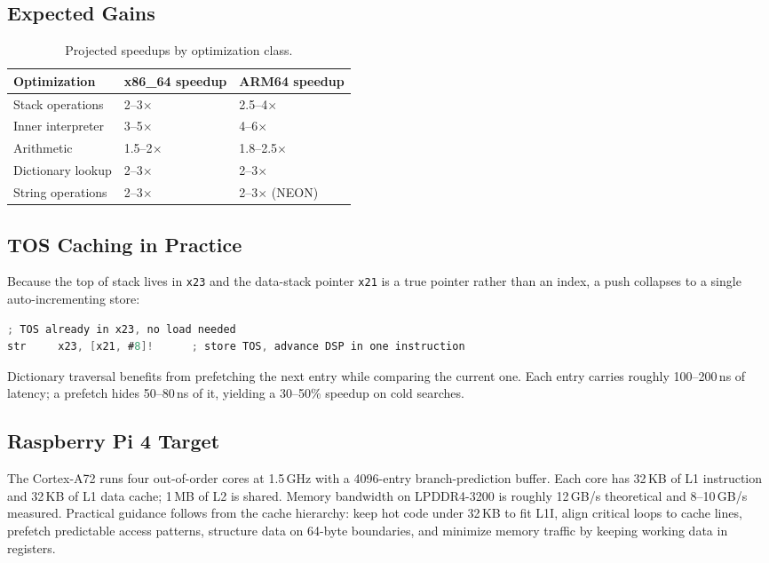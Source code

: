 \subsection{Expected Gains}

\begin{table}[h]
\centering
\begin{tabular}{lll}
\toprule
Optimization & x86\_64 speedup & ARM64 speedup \\
\midrule
Stack operations & 2--3$\times$ & 2.5--4$\times$ \\
Inner interpreter & 3--5$\times$ & 4--6$\times$ \\
Arithmetic & 1.5--2$\times$ & 1.8--2.5$\times$ \\
Dictionary lookup & 2--3$\times$ & 2--3$\times$ \\
String operations & 2--3$\times$ & 2--3$\times$ (NEON) \\
\bottomrule
\end{tabular}
\caption{Projected speedups by optimization class.}
\end{table}

\subsection{TOS Caching in Practice}

Because the top of stack lives in \texttt{x23} and the data-stack pointer
\texttt{x21} is a true pointer rather than an index, a push collapses to a
single auto-incrementing store:

\begin{lstlisting}[language=C]
; TOS already in x23, no load needed
str     x23, [x21, #8]!      ; store TOS, advance DSP in one instruction
\end{lstlisting}

Dictionary traversal benefits from prefetching the next entry while comparing
the current one. Each entry carries roughly 100--200\,ns of latency; a prefetch
hides 50--80\,ns of it, yielding a 30--50\% speedup on cold searches.

\subsection{Raspberry Pi 4 Target}

The Cortex-A72 runs four out-of-order cores at 1.5\,GHz with a 4096-entry
branch-prediction buffer. Each core has 32\,KB of L1 instruction and 32\,KB of
L1 data cache; 1\,MB of L2 is shared. Memory bandwidth on LPDDR4-3200 is
roughly 12\,GB/s theoretical and 8--10\,GB/s measured. Practical guidance
follows from the cache hierarchy: keep hot code under 32\,KB to fit L1I, align
critical loops to cache lines, prefetch predictable access patterns, structure
data on 64-byte boundaries, and minimize memory traffic by keeping working data
in registers.

